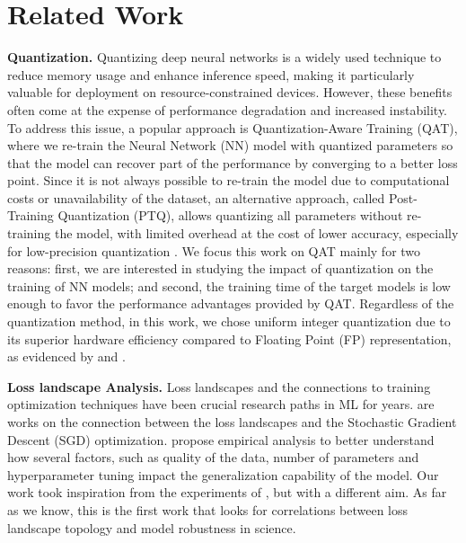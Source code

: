 \section{Related Work}
\label{sec:related-works}
\textbf{Quantization.} Quantizing deep neural networks is a widely used technique to reduce memory usage and enhance inference speed, making it particularly valuable for deployment on resource-constrained devices. However, these benefits often come at the expense of performance degradation and increased instability. To address this issue, a popular approach is Quantization-Aware Training (QAT), where we re-train the Neural Network (NN) model with quantized parameters so that the model can recover part of the performance by converging to a better loss point. Since it is not always possible to re-train the model due to computational costs or unavailability of the dataset, an alternative approach, called Post-Training Quantization (PTQ), allows quantizing all parameters without re-training the model, with limited overhead at the cost of lower accuracy, especially for low-precision quantization \cite{ptq2020, ptq2021, ptq2022, ptq2022b}. We focus this work on QAT mainly for two reasons: first, we are interested in studying the impact of quantization on the training of NN models; and second, the training time of the target models is low enough to favor the performance advantages provided by QAT. Regardless of the quantization method, in this work, we chose uniform integer quantization due to its superior hardware efficiency compared to Floating Point (FP) representation, as evidenced by \cite{integer-only} and \cite{int_vs_fp}.

\textbf{Loss landscape Analysis.} Loss landscapes and the connections to training optimization techniques have been crucial research paths in ML for years. \cite{loss_2015, large_batch2016, loss_2019} are works on the connection between the loss landscapes and the Stochastic Gradient Descent (SGD) optimization. \cite{loss2021, loss_landscape} propose empirical analysis to better understand how several factors, such as quality of the data, number of parameters and hyperparameter tuning impact the generalization capability of the model. Our work took inspiration from the experiments of \cite{loss_landscape}, but with a different aim. As far as we know, this is the first work that looks for correlations between loss landscape topology and model robustness in science.


